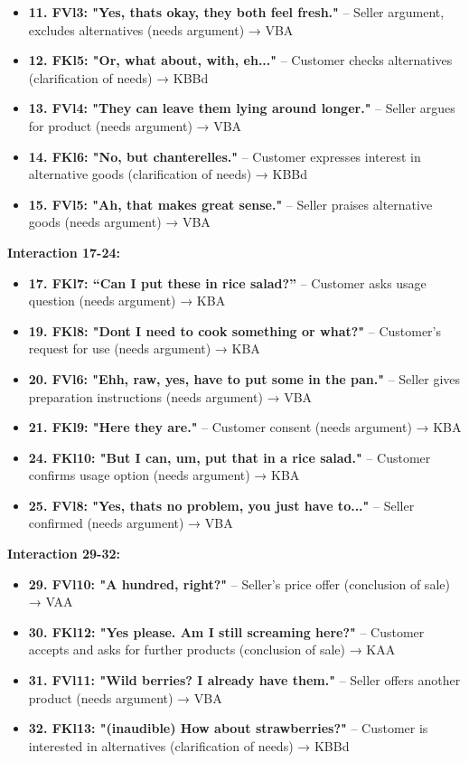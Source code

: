 \documentclass[
]{article}
\begin{document}
\begin{itemize}
\item
  \textbf{11. FVl3: "Yes, that\textquotesingle s okay, they both feel
  fresh."} -- Seller argument, excludes alternatives (needs argument) →
  VBA
\item
  \textbf{12. FKl5: "Or, what about, with, eh..."} -- Customer checks
  alternatives (clarification of needs) → KBBd
\item
  \textbf{13. FVl4: "They can leave them lying around longer."} --
  Seller argues for product (needs argument) → VBA
\item
  \textbf{14. FKl6: "No, but chanterelles."} -- Customer expresses
  interest in alternative goods (clarification of needs) → KBBd
\item
  \textbf{15. FVl5: "Ah, that makes great sense."} -- Seller praises
  alternative goods (needs argument) → VBA
\end{itemize}

\textbf{Interaction 17-24:}

\begin{itemize}
\item
  \textbf{17. FKl7: ``Can I put these in rice salad?''} -- Customer asks
  usage question (needs argument) → KBA
\item
  \textbf{19. FKl8: "Don\textquotesingle t I need to cook something or
  what?"} -- Customer's request for use (needs argument) → KBA
\item
  \textbf{20. FVl6: "Ehh, raw, yes, have to put some in the pan."} --
  Seller gives preparation instructions (needs argument) → VBA
\item
  \textbf{21. FKl9: "Here they are."} -- Customer consent (needs
  argument) → KBA
\item
  \textbf{24. FKl10: "But I can, um, put that in a rice salad."} --
  Customer confirms usage option (needs argument) → KBA
\item
  \textbf{25. FVl8: "Yes, that\textquotesingle s no problem, you just
  have to..."} -- Seller confirmed (needs argument) → VBA
\end{itemize}

\textbf{Interaction 29-32:}

\begin{itemize}
\item
  \textbf{29. FVl10: "A hundred, right?"} -- Seller's price offer
  (conclusion of sale) → VAA
\item
  \textbf{30. FKl12: "Yes please. Am I still screaming here?"} --
  Customer accepts and asks for further products (conclusion of sale) →
  KAA
\item
  \textbf{31. FVl11: "Wild berries? I already have them."} -- Seller
  offers another product (needs argument) → VBA
\item
  \textbf{32. FKl13: "(inaudible) How about strawberries?"} -- Customer
  is interested in alternatives (clarification of needs) → KBBd
\end{itemize}
\end{document}
